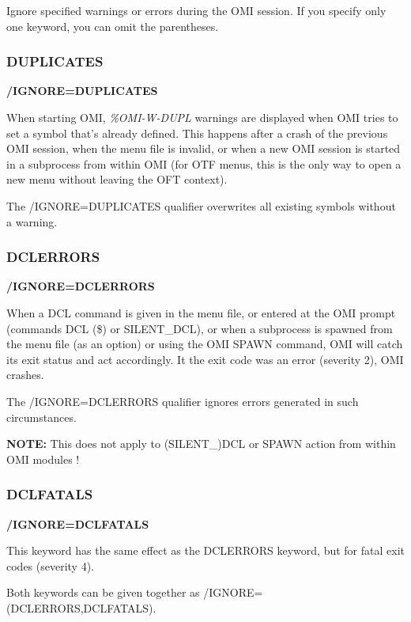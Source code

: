 \documentclass[a4paper]{book}
\newcommand{\vs}{\vspace{3mm}}
\renewcommand{\indent}{\hspace*{5mm}}
\begin{document}
Ignore specified warnings or errors during the OMI session.
If you specify only one keyword, you can omit the parentheses.

\subsubsection{DUPLICATES}
\indent\textbf{/IGNORE=DUPLICATES}

When starting OMI, \textsl{\%OMI-W-DUPL} warnings are displayed when OMI
tries to set a symbol that's already defined. This happens after
a crash of the previous OMI session, when the menu file is invalid,
or when a new OMI session is started in a subprocess from within OMI
(for OTF menus, this is the only way to open a new menu without
leaving the OFT context).

The /IGNORE=DUPLICATES qualifier overwrites all existing symbols
without a warning.
    
\subsubsection{DCLERRORS}
\indent\textbf{/IGNORE=DCLERRORS}

When a DCL command is given in the menu file, or entered at the OMI 
prompt (commands \textsf{DCL} (\$) or \textsf{SILENT\_DCL}), or when
a subprocess is spawned from the menu file (as an option) or using the
OMI \textsf{SPAWN} command, OMI will catch its exit status and act
accordingly. It the exit code was an error (severity 2), OMI crashes.

The /IGNORE=DCLERRORS qualifier ignores errors generated in such circumstances.

\vs

\textbf{NOTE:} This does not apply to \textsf{(SILENT\_)DCL} or \textsf{SPAWN} action from within OMI modules !
    
\subsubsection{DCLFATALS}
\indent\textbf{/IGNORE=DCLFATALS}


This keyword has the same effect as the DCLERRORS keyword, but for
fatal exit codes (severity 4).

Both keywords can be given together as /IGNORE=(DCLERRORS,DCLFATALS).
\end{document}
